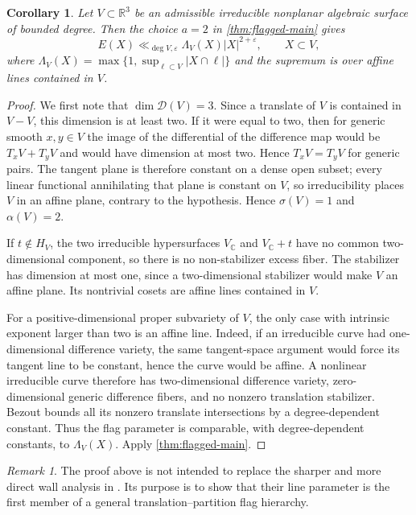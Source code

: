 \documentclass[11pt]{amsart}
\numberwithin{equation}{section}
\newtheorem{corollary}[theorem]{Corollary}
\theoremstyle{definition}
\theoremstyle{remark}
\newtheorem{remark}[theorem]{Remark}
\newcommand{\R}{\mathbb R}
\newcommand{\C}{\mathbb C}
\newcommand{\cD}{\mathcal D}
\newcommand{\eps}{\varepsilon}
\newcommand{\1}{\mathbf 1}
\newcommand{\card}[1]{\lvert #1\rvert}
\begin{document}
\begin{corollary}\label{cor:recover-jw}
Let $V\subset\R^3$ be an admissible irreducible nonplanar algebraic surface of bounded degree.  Then the choice $a=2$ in \cref{thm:flagged-main} gives
\begin{equation}\label{eq:recover-jw}
 E(X)\ll_{\deg V,\eps}\Lambda_V(X)\card X^{2+\eps},
 \qquad X\subset V,
\end{equation}
where $\Lambda_V(X)=\max\{1,\sup_{\ell\subset V}\card{X\cap\ell}\}$ and the supremum is over affine lines contained in $V$.
\end{corollary}

\begin{proof}
We first note that $\dim\cD(V)=3$.  Since a translate of $V$ is contained in $V-V$, this dimension is at least two.  If it were equal to two, then for generic smooth $x,y\in V$ the image of the differential of the difference map would be $T_xV+T_yV$ and would have dimension at most two.  Hence $T_xV=T_yV$ for generic pairs.  The tangent plane is therefore constant on a dense open subset; every linear functional annihilating that plane is constant on $V$, so irreducibility places $V$ in an affine plane, contrary to the hypothesis.  Hence $\sigma(V)=1$ and $\alpha(V)=2$.

If $t\notin H_V$, the two irreducible hypersurfaces $V_{\C}$ and $V_{\C}+t$ have no common two-dimensional component, so there is no non-stabilizer excess fiber.  The stabilizer has dimension at most one, since a two-dimensional stabilizer would make $V$ an affine plane.  Its nontrivial cosets are affine lines contained in $V$.

For a positive-dimensional proper subvariety of $V$, the only case with intrinsic exponent larger than two is an affine line.  Indeed, if an irreducible curve had one-dimensional difference variety, the same tangent-space argument would force its tangent line to be constant, hence the curve would be affine.  A nonlinear irreducible curve therefore has two-dimensional difference variety, zero-dimensional generic difference fibers, and no nonzero translation stabilizer.  Bezout bounds all its nonzero translate intersections by a degree-dependent constant.  Thus the flag parameter is comparable, with degree-dependent constants, to $\Lambda_V(X)$.  Apply \cref{thm:flagged-main}.
\end{proof}

\begin{remark}
The proof above is not intended to replace the sharper and more direct wall analysis in \cite{JingWu}.  Its purpose is to show that their line parameter is the first member of a general translation--partition flag hierarchy.
\end{remark}
\end{document}
